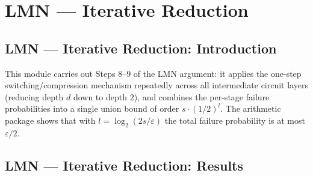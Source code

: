 \section{LMN --- Iterative Reduction}
\subsection*{LMN --- Iterative Reduction: Introduction}

This module carries out Steps 8--9 of the LMN argument: it applies the one-step
switching/compression mechanism repeatedly across all intermediate circuit layers
(reducing depth $d$ down to depth $2$), and combines the per-stage failure
probabilities into a single union bound of order $s\cdot(1/2)^l$. The arithmetic
package shows that with $l=\log_2(2s/\varepsilon)$ the total failure probability is
at most $\varepsilon/2$.

\subsection*{LMN --- Iterative Reduction: Results}

